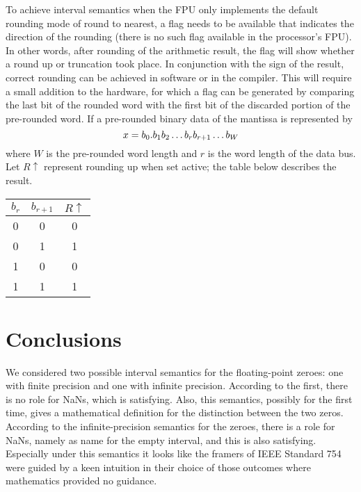 \documentclass[11pt]{article}
\begin{document}
To achieve interval semantics when the FPU only implements the
default rounding mode of round to nearest, a flag needs to be
available that indicates the direction of the rounding (there is no such
flag available in the processor's FPU).  In other words, after
rounding of the arithmetic result, the flag will show whether a round up
or truncation took place. In conjunction with the sign of the result,
correct rounding can be achieved in software or in the compiler. This
will require a small addition to the hardware, for which a flag can be
generated by comparing the last bit of the rounded word with the first
bit of the discarded portion of the pre-rounded word. If a pre-rounded
binary data of the mantissa is represented by
\begin{equation} 
   x =  b_{0}.b_{1}b_{2} \dots b_{r}b_{r+1} \dots b_{W} \\
\end{equation}
where $W$ is the pre-rounded word length and $r$ is the word length
of the data bus. Let $R\uparrow$ represent rounding up when set
active; the table below describes the result.
\vspace{.1in}
\begin{center}
\begin{tabular}{c | c || c }
	$b_{r}$ & $b_{r+1}$ & $R\uparrow$ \\ \hline
	0 & 0 & 0 \\
	0 & 1 & 1 \\
	1 & 0 & 0 \\
	1 & 1 & 1\\
\end{tabular}

\end{center}

\section{Conclusions}

We considered two possible interval semantics for the floating-point
zeroes: one with finite precision and one with infinite precision.
According to the first, there is no role for NaNs, which is
satisfying. Also, this semantics, possibly for the first time, gives a
mathematical definition for the distinction between the two
zeros. According to the infinite-precision semantics for the zeroes,
there is a role for NaNs, namely as name for the empty interval, and
this is also satisfying. Especially under this semantics it looks like
the framers of IEEE Standard 754 were guided by a keen intuition in
their choice of those outcomes where mathematics provided no guidance.
  
\end{document}
